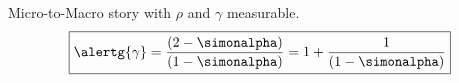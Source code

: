
  
  
   
    Micro-to-Macro story with $\rho$ and $\gamma$ measurable.
    $$
    \boxed{
      \alertg{\gamma} = \frac{(2-\simonalpha)}{(1-\simonalpha)} = 1 + \frac{1}{(1-\simonalpha)}
    }
    $$
   
